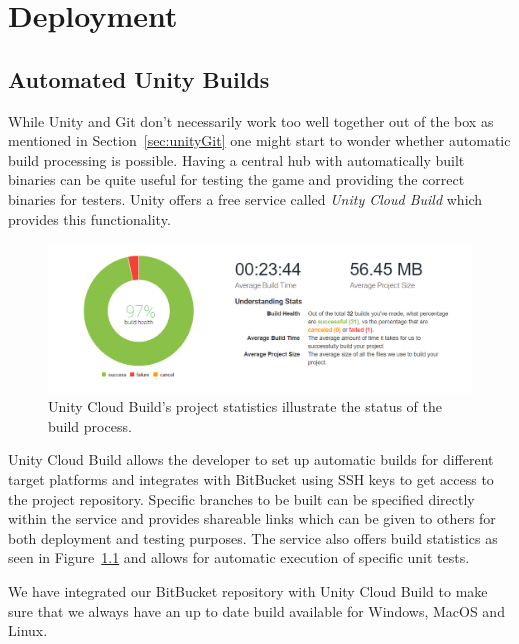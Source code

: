 \chapter{Deployment}
\label{chap:deployment}

\section{Automated Unity Builds}
While Unity and Git don't necessarily work too well together out of the box as mentioned in Section~\ref{sec:unityGit} one might start to wonder whether automatic build processing is possible. Having a central hub with automatically built binaries can be quite useful for testing the game and providing the correct binaries for testers. Unity offers a free service called \emph{Unity Cloud Build} which provides this functionality. 

\begin{figure}[tbph]  %
  \centering
  \includegraphics[width=\textwidth]{images/unityCloudBuildStats}
  \caption[Project statistics from Unity Cloud Build]{Unity Cloud Build's project statistics illustrate the status of the build process.}
  \label{fig:unityCloudStats}
\end{figure}

Unity Cloud Build allows the developer to set up automatic builds for different target platforms and integrates with BitBucket using SSH keys to get access to the project repository. Specific branches to be built can be specified directly within the service and provides shareable links which can be given to others for both deployment and testing purposes. The service also offers build statistics as seen in Figure~\ref{fig:unityCloudStats} and allows for automatic execution of specific unit tests. 

We have integrated our BitBucket repository with Unity Cloud Build to make sure that we always have an up to date build available for Windows, MacOS and Linux. 

